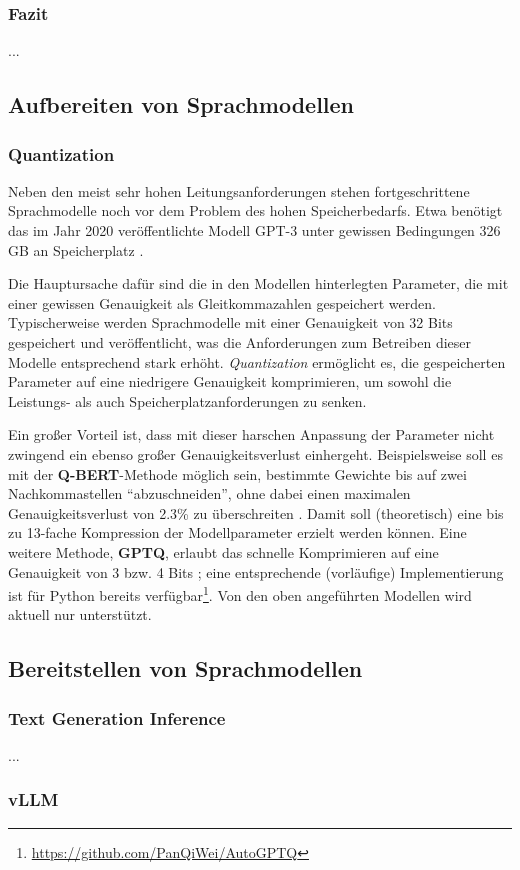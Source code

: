 \subsubsection{Fazit}

...

\subsection{Aufbereiten von Sprachmodellen}

\subsubsection{Quantization}\label{sec:quantization}

Neben den meist sehr hohen Leitungsanforderungen stehen fortgeschrittene Sprachmodelle noch vor dem Problem des hohen Speicherbedarfs. Etwa benötigt das im Jahr 2020 veröffentlichte Modell GPT-3 unter gewissen Bedingungen 326 GB an Speicherplatz \cite[1]{Frantar2022}.

\smallskip\par\noindent
Die Hauptursache dafür sind die in den Modellen hinterlegten Parameter, die mit einer gewissen Genauigkeit als Gleitkommazahlen gespeichert werden. Typischerweise werden Sprachmodelle mit einer Genauigkeit von 32 Bits gespeichert und veröffentlicht, was die Anforderungen zum Betreiben dieser Modelle entsprechend stark erhöht. \textit{Quantization} ermöglicht es, die gespeicherten Parameter auf eine niedrigere Genauigkeit komprimieren, um sowohl die Leistungs- als auch Speicherplatzanforderungen zu senken.

\smallskip\par\noindent
Ein großer Vorteil ist, dass mit dieser harschen Anpassung der Parameter nicht zwingend ein ebenso großer Genauigkeitsverlust einhergeht. Beispielsweise soll es mit der \textbf{Q-BERT}-Methode möglich sein, bestimmte Gewichte bis auf zwei Nachkommastellen \enquote{abzuschneiden}, ohne dabei einen maximalen Genauigkeitsverlust von 2.3\% zu überschreiten \cite[1]{Shen2019}. Damit soll (theoretisch) eine bis zu 13-fache Kompression der Modellparameter erzielt werden können. Eine weitere Methode, \textbf{GPTQ}, erlaubt das schnelle Komprimieren auf eine Genauigkeit von 3 bzw. 4 Bits \cite[1]{Frantar2022}; eine entsprechende (vorläufige) Implementierung ist für Python bereits verfügbar\footnote{\url{https://github.com/PanQiWei/AutoGPTQ}}. Von den oben angeführten Modellen wird aktuell nur  unterstützt.

\subsection{Bereitstellen von Sprachmodellen}

\subsubsection{Text Generation Inference}

...

\subsubsection{vLLM}